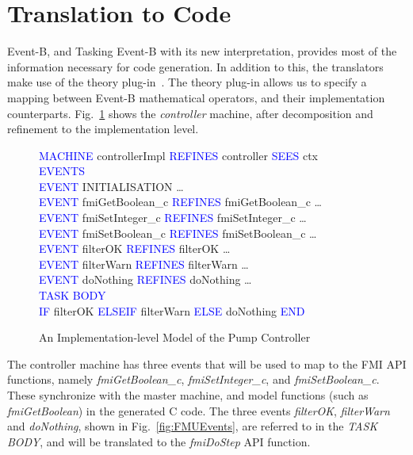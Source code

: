 \documentclass{llncs}%
\begin{document}
\section{ Translation to Code}\label{CG}
Event-B, and Tasking Event-B with its new interpretation, provides most of the information necessary for code generation. In addition to this, the translators make use of the theory plug-in~\cite{ecs18269}. The theory plug-in allows us to specify a mapping between Event-B mathematical operators, and their implementation counterparts. Fig.~\ref{fig:EBFMU} shows the \emph{controller} machine, after decomposition and refinement to the implementation level. 
%
\begin{figure}
\centering
\begin{minipage}{0.65\textwidth}
\textcolor{blue}{MACHINE} controllerImpl \textcolor{blue}{REFINES} controller \textcolor{blue}{SEES} ctx \\
\textcolor{blue}{EVENTS}\\
\hspace*{0.2cm}\textcolor{blue}{EVENT} INITIALISATION \ldots\\
\hspace*{0.2cm}\textcolor{blue}{EVENT} fmiGetBoolean\_c \textcolor{blue}{REFINES} fmiGetBoolean\_c \ldots \\
\hspace*{0.2cm}\textcolor{blue}{EVENT} fmiSetInteger\_c \textcolor{blue}{REFINES} fmiSetInteger\_c \ldots \\
\hspace*{0.2cm}\textcolor{blue}{EVENT} fmiSetBoolean\_c \textcolor{blue}{REFINES} fmiSetBoolean\_c \ldots \\
\hspace*{0.2cm}\textcolor{blue}{EVENT} filterOK \textcolor{blue}{REFINES} filterOK \ldots \\
\hspace*{0.2cm}\textcolor{blue}{EVENT} filterWarn \textcolor{blue}{REFINES} filterWarn \ldots \\
\hspace*{0.2cm}\textcolor{blue}{EVENT} doNothing \textcolor{blue}{REFINES} doNothing \ldots \\
\textcolor{blue}{TASK BODY}\\
\hspace*{0.2cm}\textcolor{blue}{IF} filterOK \textcolor{blue}{ELSEIF} filterWarn \textcolor{blue}{ELSE} doNothing \textcolor{blue}{END}
\end{minipage}
\caption{An Implementation-level Model of the Pump Controller}
\label{fig:EBFMU}
\end{figure}
%
The controller machine has three events that will be used to map to the FMI API functions, namely \emph{fmiGetBoolean\_c}, \emph{fmiSetInteger\_c}, and \emph{fmiSetBoolean\_c}. These synchronize with the master machine, and model functions (such as  \emph{fmiGetBoolean}) in the generated C code. The three events \emph{filterOK}, \emph{filterWarn} and \emph{doNothing}, shown in Fig.~\ref{fig:FMUEvents}, are referred to in the \emph{TASK BODY}, and will be translated to the \emph{fmiDoStep} API function.
\end{document}
